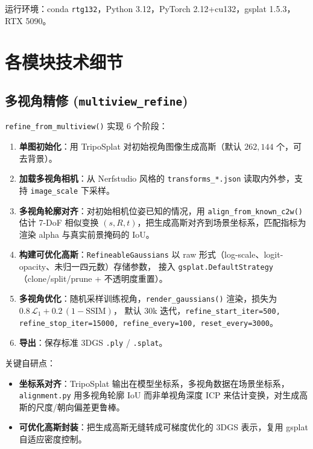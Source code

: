 \documentclass[11pt]{article}
\begin{document}
运行环境：conda \texttt{rtg132}，Python 3.12，PyTorch 2.12+cu132，gsplat 1.5.3，RTX 5090。

\section{各模块技术细节}

\subsection{多视角精修 (\texttt{multiview\_refine})}
\texttt{refine\_from\_multiview()} 实现 6 个阶段：
\begin{enumerate}[leftmargin=1.4em]
  \item \textbf{单图初始化}：用 TripoSplat 对初始视角图像生成高斯（默认 $262{,}144$ 个，可去背景）。
  \item \textbf{加载多视角相机}：从 Nerfstudio 风格的 \texttt{transforms\_*.json} 读取内外参，支持 \texttt{image\_scale} 下采样。
  \item \textbf{多视角轮廓对齐}：对初始相机位姿已知的情况，用 \texttt{align\_from\_known\_c2w()} 估计 7-DoF 相似变换
        $(s, R, t)$，把生成高斯对齐到场景坐标系，匹配指标为渲染 alpha 与真实前景掩码的 IoU。
  \item \textbf{构建可优化高斯}：\texttt{RefineableGaussians} 以 raw 形式（log-scale、logit-opacity、未归一四元数）存储参数，
        接入 \texttt{gsplat.DefaultStrategy}（clone/split/prune + 不透明度重置）。
  \item \textbf{多视角优化}：随机采样训练视角，\texttt{render\_gaussians()} 渲染，损失为 $0.8\,\mathcal{L}_1 + 0.2\,(1\!-\!\text{SSIM})$，
        默认 30k 迭代，\texttt{refine\_start\_iter=500, refine\_stop\_iter=15000, refine\_every=100, reset\_every=3000}。
  \item \textbf{导出}：保存标准 3DGS \texttt{.ply} / \texttt{.splat}。
\end{enumerate}

\noindent 关键自研点：
\begin{itemize}[leftmargin=1.4em]
  \item \textbf{坐标系对齐}：TripoSplat 输出在模型坐标系，多视角数据在场景坐标系，
        \texttt{alignment.py} 用多视角轮廓 IoU 而非单视角深度 ICP 来估计变换，对生成高斯的尺度/朝向偏差更鲁棒。
  \item \textbf{可优化高斯封装}：把生成高斯无缝转成可梯度优化的 3DGS 表示，复用 gsplat 自适应密度控制。
\end{itemize}
\end{document}
